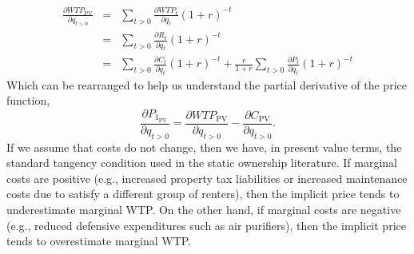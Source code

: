 \documentclass[ecta,nameyear,draft]{econsocart}
\theoremstyle{plain}
\theoremstyle{remark}
\begin{document}
\begin{eqnarray}
\frac{\partial \mathit{WTP}_{\mathrm{PV}}}{\partial q_{t>0}}&=&\sum_{t>0} \frac{\partial \mathit{WTP}_t}{\partial q_t}(1+r)^{-t}\label{pvmwtp}\nonumber\\ 
&=&\sum_{t>0} \frac{\partial R_t}{\partial q_t}(1+r)^{-t}\nonumber\\
&=&\sum_{t>0} \frac{\partial C_t}{\partial q_t}(1+r)^{-t}+\frac{r}{1+r}\sum_{t>0} \frac{\partial P_t}{\partial q_t}(1+r)^{-t}\nonumber
\end{eqnarray}
Which can be rearranged to help us understand the partial derivative of the price function,
\begin{equation}
	\frac{\partial P_{1_{\mathrm{PV}}}} {\partial q_{t>0}}=\frac{\partial \mathit{WTP}_{\mathrm{PV}}}{\partial q_{t>0}}-\frac{\partial C_{\mathrm{PV}}}{\partial q_{t>0}} \label{marginalPrice}.
\end{equation}
If we assume that costs do not change, then we have, in present value terms, the standard tangency condition used in the static ownership literature. If marginal costs are positive (e.g., increased property tax liabilities or increased maintenance costs due to satisfy a different group of renters), then the implicit price tends to underestimate marginal WTP. On the other hand, if marginal costs are negative (e.g., reduced defensive expenditures such as air purifiers), then the implicit price tends to overestimate marginal WTP.
\end{document}
